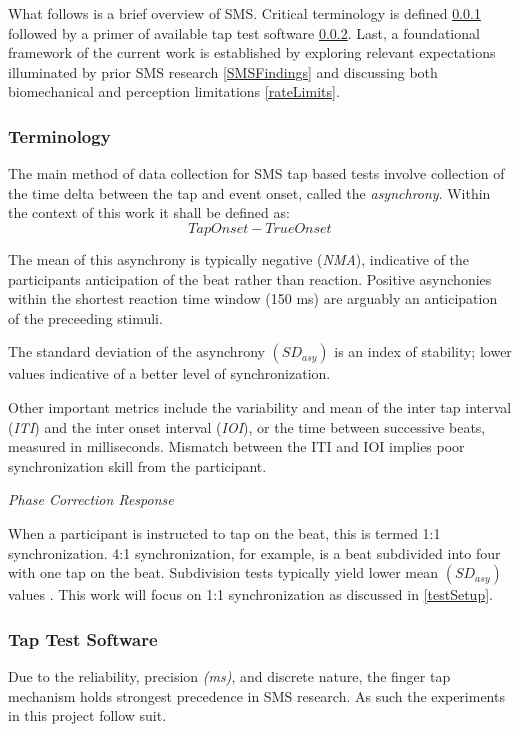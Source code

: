 What follows is a brief overview of SMS. Critical terminology is defined \ref{SMSTerms} followed by a primer of available tap test software \ref{ttsw}. Last, a foundational framework of the current work is established by exploring relevant expectations illuminated by prior SMS research \ref{SMSFindings} and discussing both biomechanical and perception limitations \ref{rateLimits}.

\subsubsection{Terminology} \label{SMSTerms}
The main method of data collection for SMS tap based tests involve collection of the time delta between the tap and event onset, called the \textit{asynchrony}. Within the context of this work it shall be defined as:
\begin{equation*}
    Tap Onset-True Onset
\end{equation*} 

The mean of this asynchrony is typically negative (\textit{NMA}), indicative of the participants anticipation of the beat rather than reaction. Positive asynchonies within the shortest reaction time window (150 ms) are arguably an anticipation of the preceeding stimuli. 

The standard deviation of the asynchrony $(SD_{asy})$ is an index of stability; lower values indicative of a better level of synchronization.  \cite{repp2013sensorimotor}

Other important metrics include the variability and mean of the inter tap interval (\textit{ITI}) and the inter onset interval (\textit{IOI}), or the time between successive beats, measured in milliseconds. Mismatch between the ITI and IOI implies poor synchronization skill from the participant. 

\textit{Phase Correction Response} 

When a participant is instructed to tap on the beat, this is termed 1:1 synchronization. 4:1 synchronization, for example, is a beat subdivided into four with one tap on the beat. Subdivision tests typically yield lower mean $(SD_{asy})$ values \cite{repp2013sensorimotor}. This work will focus on 1:1 synchronization as discussed in \ref{testSetup}.

\subsubsection{Tap Test Software} \label{ttsw}
Due to the reliability, precision \textit{(ms)}, and discrete nature, the finger tap mechanism holds strongest precedence in SMS research. As such the experiments in this project follow suit. 

